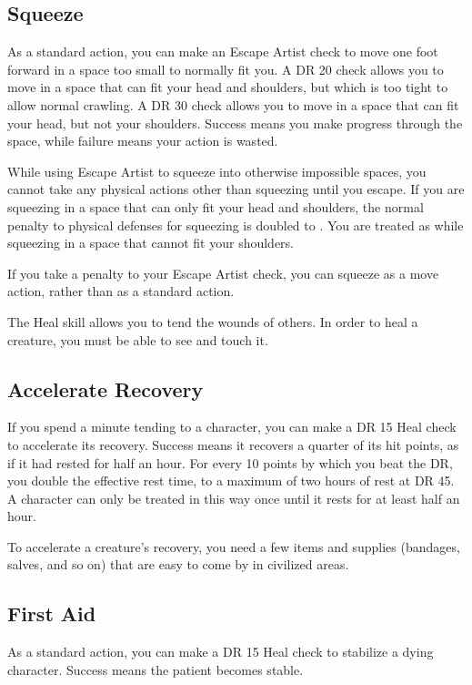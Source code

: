     \subsection{Squeeze}
        As a standard action, you can make an Escape Artist check to move one foot forward in a space too small to normally fit you. A DR 20 check allows you to move in a space that can fit your head and shoulders, but which is too tight to allow normal crawling. A DR 30 check allows you to move in a space that can fit your head, but not your shoulders. Success means you make progress through the space, while failure means your action is wasted.

        While using Escape Artist to squeeze into otherwise impossible spaces, you cannot take any physical actions other than squeezing until you escape. If you are squeezing in a space that can only fit your head and shoulders, the normal penalty to physical defenses for squeezing is doubled to . You are treated as \helpless while squeezing in a space that cannot fit your shoulders.

        If you take a  penalty to your Escape Artist check, you can squeeze as a move action, rather than as a standard action.

        The Heal skill allows you to tend the wounds of others. In order to heal a creature, you must be able to see and touch it.

    \subsection{Accelerate Recovery}\label{Accelerate Recovery}
        If you spend a minute tending to a character, you can make a DR 15 Heal check to accelerate its recovery.
        Success means it recovers a quarter of its hit points, as if it had rested for half an hour.
        For every 10 points by which you beat the DR, you double the effective rest time, to a maximum of two hours of rest at DR 45.
        A character can only be treated in this way once until it rests for at least half an hour.

        To accelerate a creature's recovery, you need a few items and supplies (bandages, salves, and so on) that are easy to come by in civilized areas.

    \subsection{First Aid}
        As a standard action, you can make a DR 15 Heal check to stabilize a dying character. Success means the patient becomes stable.


